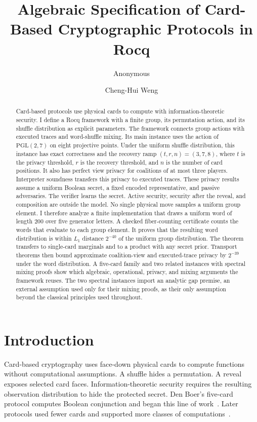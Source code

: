 \documentclass[runningheads]{llncs}
\title{Algebraic Specification of Card-Based Cryptographic Protocols in Rocq}
\author{Anonymous}
\institute{Submission to WADT 2026}
\author{Cheng-Hui Weng}
\institute{Nagoya University}
\newcommand{\Rocq}{Rocq}
\newcommand{\PG}{\mathrm{PGL}(2,7)}
\begin{document}
\maketitle

\begin{abstract}
Card-based protocols use physical cards to compute with information-theoretic
security. I define a \Rocq{} framework with a finite group, its permutation
action, and its shuffle distribution as explicit parameters. The framework
connects group actions with executed traces and word-shuffle mixing. Its main
instance uses the action of $\PG$ on eight projective points. Under the
uniform shuffle distribution, this instance has exact correctness and the
recovery ramp $(t,r,n)=(3,7,8)$, where $t$ is the privacy threshold, $r$ is
the recovery threshold, and $n$ is the number of card positions. It also has
perfect view privacy for coalitions of at most three players. Interpreter
soundness transfers this privacy to executed traces. These privacy results
assume a uniform Boolean secret, a fixed encoded representative, and passive
adversaries. The verifier learns the secret. Active security, security after
the reveal, and composition are outside the model. No single physical move
samples a uniform group element. I therefore analyze a finite implementation
that draws a uniform word of length 200 over five generator letters. A checked
fiber-counting certificate counts the words that evaluate to each group
element. It proves that the resulting word distribution is within $L_1$
distance $2^{-40}$ of the uniform group distribution. The theorem transfers to
single-card marginals and to a product with any secret prior. Transport
theorems then bound approximate coalition-view and executed-trace privacy by
$2^{-39}$ under the word distribution. A five-card family and two related
instances with spectral mixing proofs show which algebraic, operational,
privacy, and mixing arguments the framework reuses. The two spectral instances
import an analytic gap premise, an external assumption used only for their
mixing proofs, as their only assumption beyond the classical principles used
throughout.
\end{abstract}

\section{Introduction}\label{sec:introduction}

Card-based cryptography uses face-down physical cards to compute functions
without computational assumptions. A shuffle hides a permutation. A reveal
exposes selected card faces. Information-theoretic security requires the
resulting observation distribution to hide the protected secret. Den Boer's
five-card protocol computes Boolean conjunction and began this line of
work~\cite{denBoer1989}. Later protocols used fewer cards and supported more
classes of
computations~\cite{MizukiSone2009,MizukiSone2012,KochWalzerHartel2015}.
\end{document}
